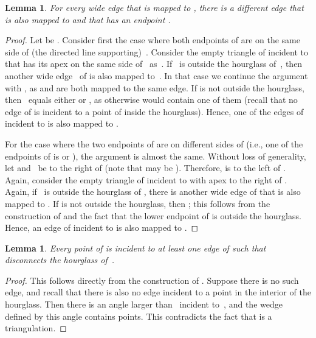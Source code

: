 \documentclass[11pt,a4paper]{article}
\newcommand{\myqed}{\qed}
\renewcommand{\myqed}{}
\newtheorem{lemma}[theorem]{Lemma}
\begin{document}
\begin{lemma}\label{lem_no_wide}
For every wide edge  that is mapped to , there is a different edge  that is also mapped to  and that has an endpoint .
\end{lemma}
\begin{proof}
Let  be .
Consider first the case where both endpoints of  are on the same side of (the directed line supporting)~.
Consider the empty triangle  of  incident to  that has its apex  on the same side of~ as~.
If~ is outside the hourglass of~, then another wide edge~ of  is also mapped to~.
In that case we continue the argument with , as  and  are both mapped to the same edge.
If  is not outside the hourglass, then~ equals either  or , as otherwise  would contain one of them (recall that no edge of  is incident to a point of  inside the hourglass).
Hence, one of the edges of  incident to  is also mapped to .

For the case where the two endpoints of  are on different sides of  (i.e., one of the endpoints of  is  or ), the argument is almost the same.
Without loss of generality, let  and~ be to the right of  (note that  may be ).
Therefore,  is to the left of .
Again, consider the empty triangle  of  incident to  with apex  to the right of .
Again, if~ is outside the hourglass of , there is another wide edge  of  that is also mapped to .
If  is not outside the hourglass, then ; this follows from the construction of  and the fact that the lower endpoint of  is outside the hourglass.
Hence, an edge of  incident to  is also mapped to .
\myqed
\end{proof}

\begin{lemma}\label{lem_inner_degree}
Every point  of  is incident to at least one edge  of  such that~ disconnects the hourglass of~.
\end{lemma}
\begin{proof}
This follows directly from the construction of .
Suppose there is no such edge, and recall that there is also no edge incident to a point in the interior of the hourglass. Then there is an angle larger than~ incident to~, and the wedge defined by this angle contains points.
This contradicts the fact that  is a triangulation.
\myqed
\end{proof}
\end{document}
